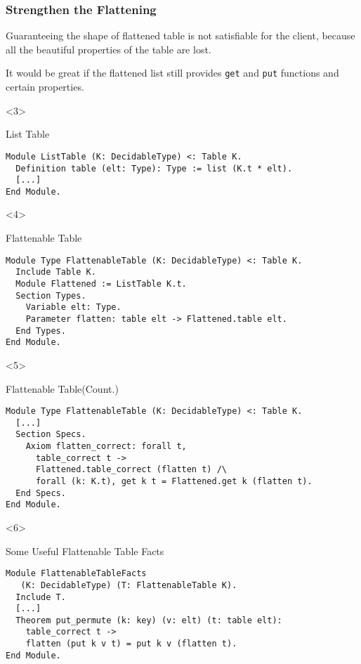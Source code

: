\documentclass{beamer}
\begin{document}
\begin{frame}[t, fragile]
\frametitle{Strengthen the Flattening}

Guaranteeing the shape of flattened table is not satisfiable for the client,
because all the beautiful properties of the table are lost. \\ \pause

It would be great if the flattened list still provides \texttt{get} and
\texttt{put} functions and certain properties. \pause

\begin{onlyenv}<3>
  \begin{block}{List Table}
\begin{verbatim}
Module ListTable (K: DecidableType) <: Table K.
  Definition table (elt: Type): Type := list (K.t * elt).
  [...]
End Module.
\end{verbatim}
  \end{block}
\end{onlyenv}

\begin{onlyenv}<4>
  \begin{block}{Flattenable Table}
\begin{verbatim}
Module Type FlattenableTable (K: DecidableType) <: Table K.
  Include Table K.
  Module Flattened := ListTable K.t.
  Section Types.
    Variable elt: Type.
    Parameter flatten: table elt -> Flattened.table elt.
  End Types. 
End Module.
\end{verbatim}
  \end{block}
\end{onlyenv}

\begin{onlyenv}<5>
  \begin{block}{Flattenable Table(Count.)}
\begin{verbatim}
Module Type FlattenableTable (K: DecidableType) <: Table K.
  [...]
  Section Specs.
    Axiom flatten_correct: forall t,
      table_correct t ->
      Flattened.table_correct (flatten t) /\
      forall (k: K.t), get k t = Flattened.get k (flatten t).
  End Specs. 
End Module.
\end{verbatim}
  \end{block}
\end{onlyenv}

\begin{onlyenv}<6>
  \begin{block}{Some Useful Flattenable Table Facts}
\begin{verbatim}
Module FlattenableTableFacts
   (K: DecidableType) (T: FlattenableTable K).
  Include T.
  [...]
  Theorem put_permute (k: key) (v: elt) (t: table elt):
    table_correct t ->
    flatten (put k v t) = put k v (flatten t). 
End Module.
\end{verbatim}
  \end{block}
\end{onlyenv}

\end{frame}
\end{document}
